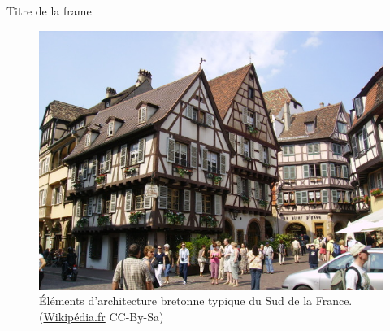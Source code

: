 \documentclass{bredelebeamer}
\begin{document}
\begin{frame}{Titre de la frame}

\begin{figure}
\centering
\includegraphics[scale=0.5]{images/architecturebretonne_wikipedia.jpg}
\caption{Éléments d'architecture bretonne typique du Sud de la France. (\href{http://commons.wikimedia.org/wiki/File:Colmar_-_Alsace.jpg}{Wikipédia.fr} CC-By-Sa)}
\end{figure}

\end{frame}
\end{document}
